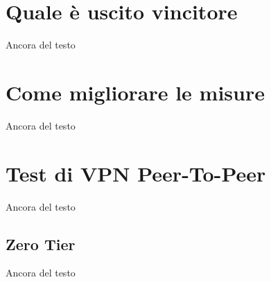 \section{Quale è uscito vincitore}
Ancora del testo

\section{Come migliorare le misure}
Ancora del testo

\section{Test di VPN Peer-To-Peer}
Ancora del testo

\subsection{Zero Tier}
Ancora del testo